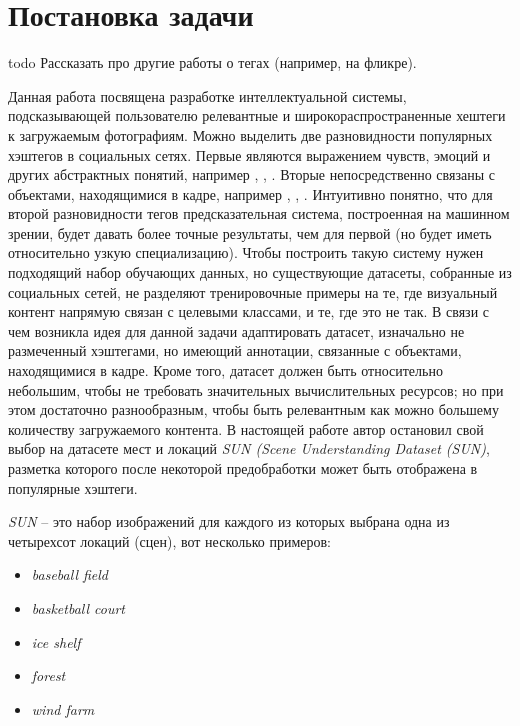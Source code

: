 \section{Постановка задачи}

todo Рассказать про другие работы о тегах (например, на фликре).

\indent
\indent
Данная работа посвящена разработке интеллектуальной системы, 
подсказывающей пользователю релевантные и широкораспространенные
хештеги к загружаемым фотографиям.
Можно выделить две разновидности популярных хэштегов в социальных сетях.
Первые являются выражением чувств, эмоций и других абстрактных понятий,
например , , . Вторые непосредственно
связаны с объектами, находящимися в кадре, например  
, , . 
Интуитивно понятно, что для второй разновидности
тегов предсказательная система, построенная на машинном зрении, будет
давать более точные результаты, чем для первой (но будет
иметь относительно узкую специализацию). Чтобы построить такую систему
нужен подходящий набор обучающих данных, но существующие датасеты, 
собранные из социальных сетей, не разделяют тренировочные примеры на те, 
где визуальный контент напрямую связан с целевыми классами, и те, где это не так.
В связи с чем возникла идея для данной задачи 
адаптировать датасет, изначально не размеченный
хэштегами, но имеющий аннотации, связанные с объектами,
находящимися в кадре. Кроме того, датасет должен быть относительно небольшим,
чтобы не требовать значительных 
вычислительных ресурсов; но при этом достаточно разнообразным, чтобы 
быть релевантным как можно большему количеству загружаемого контента.
В настоящей работе автор остановил свой выбор на датасете мест и локаций 
 \textit{SUN (Scene Understanding Dataset\cite{sundata} (SUN)}, 
 разметка которого после некоторой предобработки может быть отображена в популярные хэштеги.


\indent  
\textit{SUN} -- это набор изображений для каждого из которых выбрана одна
  из четырехсот локаций (сцен), вот несколько примеров:
  
  
\begin{itemize}
    \item \textit{baseball field}
    \item \textit{basketball court}
    \item \textit{ice shelf}
    \item \textit{forest}
    \item \textit{wind farm}
\end{itemize}


